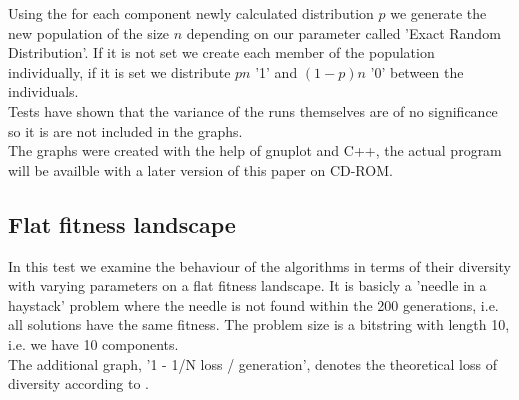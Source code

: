 \documentclass[a4paper,twoside]{report}
\begin{document}
Using the for each component newly calculated distribution \(p\) we generate the new population of the size \(n\) depending on our parameter called 'Exact Random Distribution'. If it is not set we create each member of the population individually, if it is set we distribute \(pn\) '1' and \((1-p)n\) '0' between the individuals.\\
Tests have shown that the variance of the runs themselves are of no significance so it is are not included in the graphs.\\
The graphs were created with the help of gnuplot and C++, the actual program will be availble with a later version of this paper on CD-ROM.\\

\subsection{Flat fitness landscape}

In this test we examine the behaviour of the algorithms in terms of their diversity with varying parameters on a flat fitness landscape. It is basicly a 'needle in a haystack' problem where the needle is not found within the 200 generations, i.e. all solutions have the same fitness. The problem size is a bitstring with length 10, i.e. we have 10 components.\\
The additional graph, '1 - 1/N loss / generation', denotes the theoretical loss of diversity according to \cite{Shapiro}.
\end{document}
